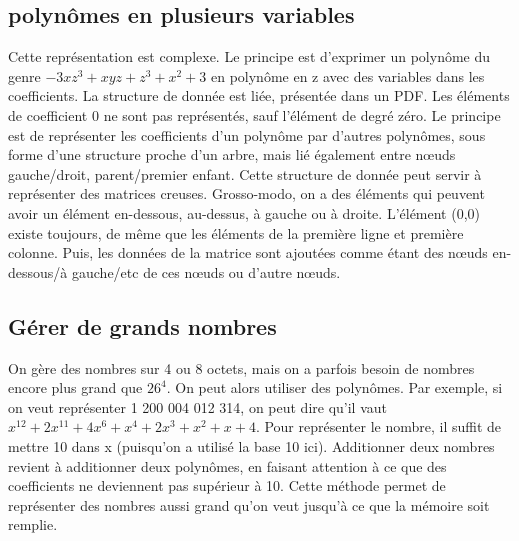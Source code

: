\documentclass[10pt]{article}
\begin{document}
\subsection{polynômes en plusieurs variables}
Cette représentation est complexe. Le principe est d'exprimer un polynôme du genre $-3xz^{3} + xyz + z^{3} + x^{2} + 3$ en polynôme en z avec des variables dans les coefficients. 
\newline \newline 
La structure de donnée est liée, présentée dans un PDF. Les éléments de coefficient 0 ne sont pas représentés, sauf l'élément de degré zéro. Le principe est de représenter les coefficients d'un polynôme par d'autres polynômes, sous forme d'une structure proche d'un arbre, mais lié également entre nœuds gauche/droit, parent/premier enfant. 
\newline \newline 
Cette structure de donnée peut servir à représenter des matrices creuses. Grosso-modo, on a des éléments qui peuvent avoir un élément en-dessous, au-dessus, à gauche ou à droite. L'élément (0,0) existe toujours, de même que les éléments de la première ligne et première colonne. Puis, les données de la matrice sont ajoutées comme étant des nœuds en-dessous/à gauche/etc de ces nœuds ou d'autre nœuds.
\subsection{Gérer de grands nombres}
On gère des nombres sur 4 ou 8 octets, mais on a parfois besoin de nombres encore plus grand que $26^{4}$. On peut alors utiliser des polynômes. Par exemple, si on veut représenter 1 200 004 012 314, on peut dire qu'il vaut $x^{12} + 2x^{11} + 4x^{6} + x^{4} + 2x^{3} + x^{2} + x + 4$. Pour représenter le nombre, il suffit de mettre 10 dans x (puisqu'on a utilisé la base 10 ici).  
\newline \newline 
Additionner deux nombres revient à additionner deux polynômes, en faisant attention à ce que des coefficients ne deviennent pas supérieur à 10. Cette méthode permet de représenter des nombres aussi grand qu'on veut jusqu'à ce que la mémoire soit remplie.
\newpage
\end{document}
